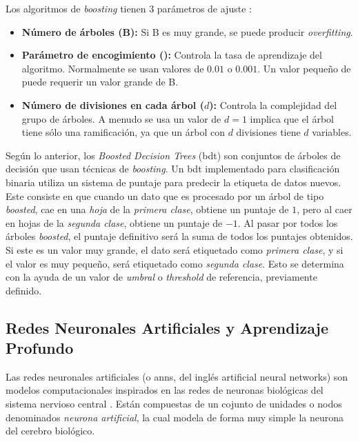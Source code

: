 Los algoritmos de \emph{boosting} tienen 3 parámetros de ajuste \cite{James}:
\begin{itemize}
    \item \textbf{Número de árboles (B):} Si B es muy grande, se puede producir \emph{overfitting}.
    \item \textbf{Parámetro de encogimiento (\lambda):} Controla la tasa de aprendizaje del algoritmo. Normalmente se usan valores de $0.01$ o $0.001$. Un valor pequeño de \lambda puede requerir un valor grande de B.
    \item \textbf{Número de divisiones en cada árbol ($d$):} Controla la complejidad del grupo de árboles. A menudo se usa un valor de $d=1$ implica que el árbol tiene sólo una ramificación, ya que un árbol con $d$ divisiones tiene $d$ variables.
\end{itemize}
%
Según lo anterior, los \emph{Boosted Decision Trees} (\acrshort{bdt}) son conjuntos de árboles de decisión que usan técnicas de \emph{boosting}. 
%
Un \acrshort{bdt} implementado para clasificación binaria utiliza un sistema de puntaje para predecir la etiqueta de datos nuevos. 
%
Este consiste en que cuando un dato que es procesado por un árbol de tipo \emph{boosted}, cae en una \textit{hoja} de la \textit{primera clase}, obtiene un puntaje de $1$, pero al caer en hojas de la \textit{segunda clase}, obtiene un puntaje de $-1$. Al pasar por todos los árboles \emph{boosted}, el puntaje definitivo será la suma de todos los puntajes obtenidos. Si este es un valor muy grande, el dato será etiquetado como \textit{primera clase}, y si el valor es muy pequeño, será etiquetado como \textit{segunda clase}. Esto se determina con la ayuda de un valor de \textit{umbral} o \emph{threshold} de referencia, previamente definido. 
%
%
\subsection{Redes Neuronales Artificiales y Aprendizaje Profundo}
%
Las redes neuronales artificiales (o \acrshort{ann}s, del inglés artificial neural networks) son modelos computacionales inspirados en las redes de neuronas biológicas del sistema nervioso central \cite{Graupe}. Están compuestas de un cojunto de unidades o nodos denominados \textit{neurona artificial}, la cual modela de forma muy simple la neurona del cerebro biológico. 
%
%
%
%
%
%
%
%
